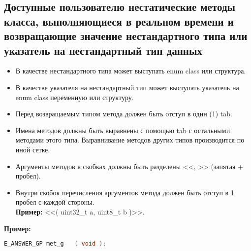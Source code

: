 \subsection{Доступные пользователю нестатические методы класса, выполняющиеся в реальном времени и возвращающие значение нестандартного типа или указатель на нестандартный тип данных}\label{dp:n:n}
\begin{itemize}
	\item В качестве нестандартного типа может выступать enum class или структура.
	\item В качестве указателя на нестандартный тип может выступать указатель на enum class переменную или структуру.
	\item Перед возвращаемым типом метода должен быть отступ в один (1) tab.
	\item Имена методов должны быть выравнены с помощью tab с остальными методами этого типа. Выравнивание методов других типов производится по иной сетке.
	\item Аргументы методов в скобках должны быть разделены <<, >> (запятая + пробел).
	\item Внутри скобок перечисления аргументов метода должен быть отступ в 1 пробел с каждой стороны.\\\textbf{Пример: } <<( uint32\_t a, uint8\_t b )>>.
\end{itemize}
\textbf{Пример:}\begin{lstlisting}[language=C++, frame=tlBR, basicstyle=\fontsize{10}{10}\ttfamily]
	E_ANSWER_GP	met_g	( void );
\end{lstlisting}

